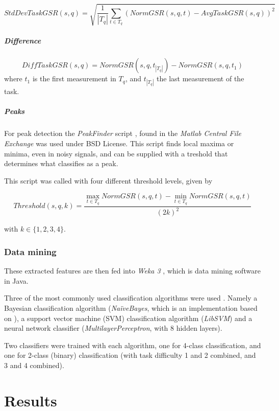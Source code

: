 \documentclass[11pt,leqno,a4paper]{report} %
\begin{document}
\[
StdDevTaskGSR(s,q) = \sqrt {\frac{1}{\left\vert{T_q}\right\vert}   \sum_{t \in T_q} (NormGSR(s,q,t) - AvgTaskGSR(s,q))^2 }
\]

\paragraph{Difference}

\[
DiffTaskGSR(s,q) = NormGSR(s,q, t_{\left\vert{T_q}\right\vert}) - NormGSR(s,q, t_1)
\]
where $t_1$ is the first measurement in $T_q$, and $t_{\left\vert{T_q}\right\vert}$ the last measurement of the task.

\paragraph{Peaks}
For peak detection the \emph{PeakFinder} script \citep{yoder}, found in the \emph{Matlab Central File Exchange} was used under BSD License. This script finds local maxima or minima, even in noisy signals, and can be supplied with a treshold that determines what classifies as a peak.

This script was called with four different threshold levels, given by

\[
Threshold(s,q,k) = \frac 
{\max_{t \in T_q} NormGSR(s,q,t) - \min_{t \in T_q} NormGSR(s,q,t)} 
{(2k)^2}
\]

with $k \in \{1,2,3,4\}$.


\subsection{Data mining}

These extracted features are then fed into \emph{Weka 3} \citep{weka}, which is data mining software in Java. 


Three of the most commonly used classification algorithms were used \citep{small}. Namely a Bayesian classification algorithm (\emph{Na\"iveBayes}, which is an implementation based on \citep{john1995estimating}), a support vector machine (SVM) classification algorithm (\emph{LibSVM}) \citep{libsvm} and a neural network classifier (\emph{MultilayerPerceptron}, with 8 hidden layers). 

Two classifiers  were trained with each algorithm, one for 4-class classification, and one for 2-class (binary) classification (with task difficulty 1 and 2 combined, and 3 and 4 combined).


\chapter{Results}
\end{document}
